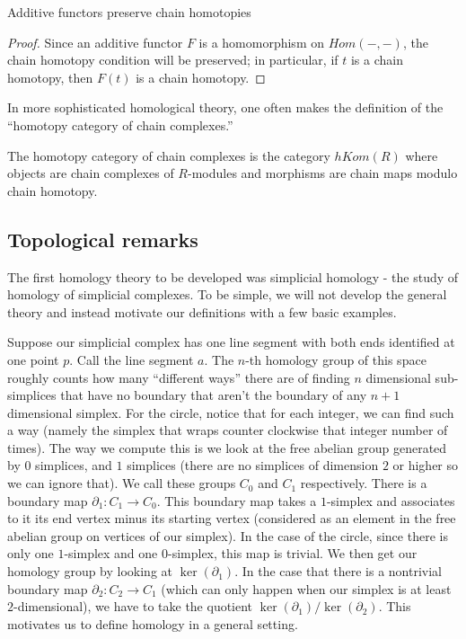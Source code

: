 \begin{theorem} Additive functors preserve chain homotopies
\end{theorem}
\begin{proof} Since an additive functor $F$ is a homomorphism on $Hom(-,-)$,
the chain homotopy condition will be preserved; in
particular, if $t$ is a chain homotopy, then $F(t)$ is a chain
homotopy.\end{proof}

In more sophisticated homological theory, one often makes the
definition of the ``homotopy category of chain complexes.''
\begin{definition} The homotopy category of chain complexes is
the category $hKom(R)$ where objects are chain complexes of
$R$-modules and morphisms are chain maps modulo chain homotopy.
\end{definition}


\subsection{Topological remarks}
The first homology theory
to be developed was simplicial homology - the study of homology
of simplicial
complexes. To be simple, we will not develop the general theory
and instead
motivate our definitions with a few basic examples.

\begin{example} Suppose
our simplicial complex has one line segment with both ends
identified at
one point $p$. Call the line segment $a$. The $n$-th homology
group of this
space roughly counts how many ``different ways'' there are of
finding $n$
dimensional sub-simplices that have no boundary that aren't the
boundary of
any $n+1$ dimensional simplex. For the circle, notice that for
each integer,
we can find such a way (namely the simplex that wraps counter
clockwise that
integer number of times). The way we compute this is we look at
the free abelian group generated by $0$ simplices, and $1$
simplices (there are no simplices of
dimension $2$ or higher so we can ignore that). We call these
groups $C_0$ and
$C_1$ respectively. There is a boundary map $\partial_1:
C_1\rightarrow C_0$.
This boundary map takes a $1$-simplex and associates to it its
end vertex minus
its starting vertex (considered as an element in the free
abelian group on
vertices of our simplex). In the case of the circle, since there
is only one
$1$-simplex and one $0$-simplex, this map is trivial. We then
get our homology
group by looking at $\ker(\partial_1)$. In the case that there
is a nontrivial
boundary map $\partial_2: C_2\rightarrow C_1$ (which can only
happen when our
simplex is at least $2$-dimensional), we have to take the
quotient
$\ker(\partial_1)/\ker(\partial_2)$. This motivates us to define
homology in a
general setting.
\end{example}

